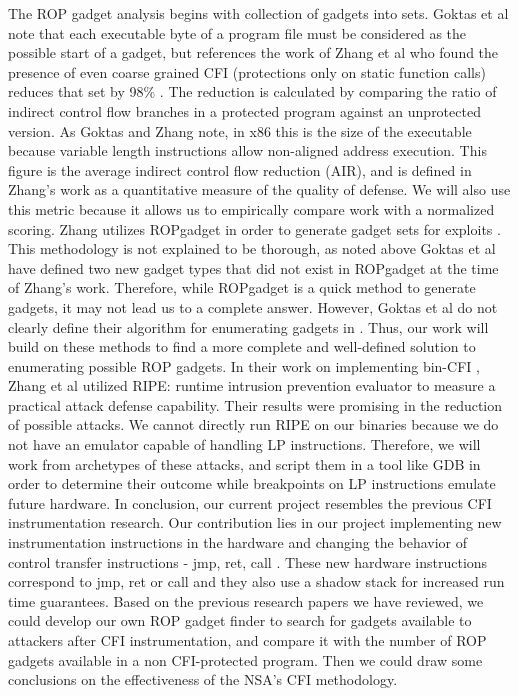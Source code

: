 \documentclass[letterpaper,10pt]{article}
\begin{document}
\newline
\indent	The ROP gadget analysis begins with collection of gadgets into sets. Goktas et al note that each executable byte of a program file must be considered as the possible start of a gadget, but references the work of Zhang et al who found the presence of even coarse grained CFI (protections only on static function calls) reduces that set by 98\% \cite{Zhang:2013:COTS}. The reduction is calculated by comparing the ratio of indirect control flow branches in a protected program against an unprotected version. As Goktas and Zhang note, in x86 this is the size of the executable because variable length instructions allow non-aligned address execution. This figure is the average indirect control flow reduction (AIR), and is defined in Zhang's work as a quantitative measure of the quality of defense. We will also use this metric because it allows us to empirically compare work with a normalized scoring.
\newline
\indent Zhang utilizes ROPgadget\cite{Salwan} in order to generate gadget sets for exploits \cite{Zhang:2013:COTS}. This methodology is not explained to be thorough, as noted above Goktas et al have defined two new gadget types that did not exist in ROPgadget at the time of Zhang's work. Therefore, while ROPgadget is a quick method to generate gadgets, it may not lead us to a complete answer. However, Goktas et al do not clearly define their algorithm for enumerating gadgets in \cite{goktas}. Thus, our work will build on these methods to find a more complete and well-defined solution to enumerating possible ROP gadgets. In their work on implementing bin-CFI \cite{Zhang:2013:COTS}, Zhang et al utilized RIPE: runtime intrusion prevention evaluator \cite{Wilander:2011} to measure a practical attack defense capability. Their results were promising in the reduction of possible attacks. We cannot directly run RIPE on our binaries because we do not have an emulator capable of handling LP instructions. Therefore, we will work from archetypes of these attacks, and script them in a tool like GDB in order to determine their outcome while breakpoints on LP instructions emulate future hardware.
\newline
\indent In conclusion, our current project resembles the previous CFI instrumentation research. Our contribution lies in our project implementing new instrumentation instructions in the hardware and changing the behavior of control transfer instructions - jmp, ret, call \cite{NSAGitHub}. These new hardware instructions correspond to jmp, ret or call and they also use a shadow stack for increased run time guarantees. Based on the previous research papers we have reviewed, we could develop our own ROP gadget finder to search for gadgets available to attackers after CFI instrumentation, and compare it with the number of ROP gadgets available in a non CFI-protected program. Then we could draw some conclusions on the effectiveness of the NSA's CFI methodology.
\newpage
{}

\end{document}

